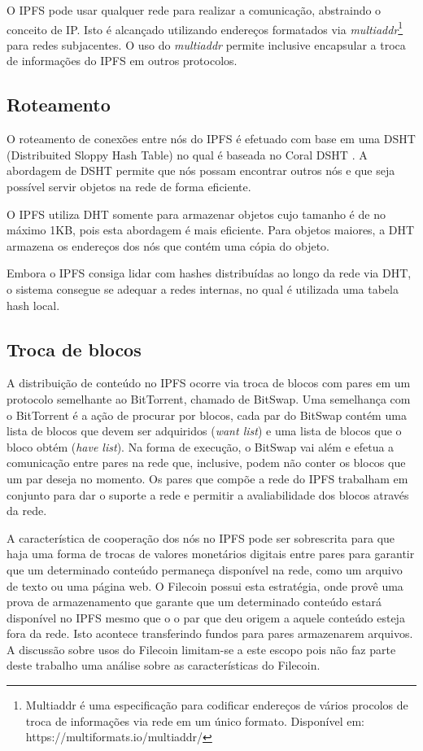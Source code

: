\documentclass[tcc,capa]{texufpel}
\begin{document}
        O IPFS pode usar qualquer rede para realizar a comunicação, abstraindo o conceito de IP. Isto é alcançado utilizando endereços formatados via \textit{multiaddr}\footnote{Multiaddr é uma especificação para codificar endereços de vários procolos de troca de informações via rede em um único formato. Disponível em: https://multiformats.io/multiaddr/} para redes subjacentes. O uso do \textit{multiaddr} permite inclusive encapsular a troca de informações do IPFS em outros protocolos.
        
        \subsection{Roteamento}
        
        O roteamento de conexões entre nós do IPFS é efetuado com base em uma DSHT (Distribuited Sloppy Hash Table) no qual é baseada no Coral DSHT \cite{freedman2003sloppy}. A abordagem de DSHT permite que nós possam encontrar outros nós e que seja possível servir objetos na rede de forma eficiente. 
        
        O IPFS utiliza DHT somente para armazenar objetos cujo tamanho é de no máximo 1KB, pois esta abordagem é mais eficiente. Para objetos maiores, a DHT armazena os endereços dos nós que contém uma cópia do objeto.
        
        Embora o IPFS consiga lidar com hashes distribuídas ao longo da rede via DHT, o sistema consegue se adequar a redes internas, no qual é utilizada uma tabela hash local.
        
        \subsection{Troca de blocos}
        
        A distribuição de conteúdo no IPFS ocorre via troca de blocos com pares em um protocolo semelhante ao BitTorrent, chamado de BitSwap. Uma semelhança com o BitTorrent é a ação de procurar por blocos, cada par do BitSwap contém uma lista de blocos que devem ser adquiridos (\textit{want list}) e uma lista de blocos que o bloco obtém (\textit{have list}). Na forma de execução, o BitSwap vai além e efetua a comunicação entre pares na rede que, inclusive, podem não conter os blocos que um par deseja no momento. Os pares que compõe a rede do IPFS trabalham em conjunto para dar o suporte a rede e permitir a avaliabilidade dos blocos através da rede.
        
        A característica de cooperação dos nós no IPFS pode ser sobrescrita para que haja uma forma de trocas de valores monetários digitais entre pares para garantir que um determinado conteúdo permaneça disponível na rede, como um arquivo de texto ou uma página web. O Filecoin possui esta estratégia, onde provê uma prova de armazenamento que garante que um determinado conteúdo estará disponível no IPFS mesmo que o o par que deu origem a aquele conteúdo esteja fora da rede. Isto acontece transferindo fundos para pares armazenarem arquivos. A discussão sobre usos do Filecoin limitam-se a este escopo pois não faz parte deste trabalho uma análise sobre as características do Filecoin.
        
\end{document}
